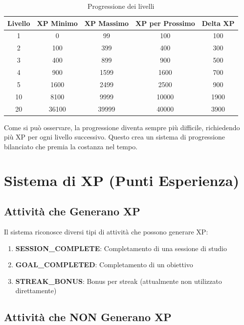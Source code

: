 \documentclass[11pt,a4paper]{article}
\begin{document}
\begin{table}[H]
\centering
\begin{tabular}{@{}ccccc@{}}
\toprule
\textbf{Livello} & \textbf{XP Minimo} & \textbf{XP Massimo} & \textbf{XP per Prossimo} & \textbf{Delta XP} \\
\midrule
1 & 0 & 99 & 100 & 100 \\
2 & 100 & 399 & 400 & 300 \\
3 & 400 & 899 & 900 & 500 \\
4 & 900 & 1599 & 1600 & 700 \\
5 & 1600 & 2499 & 2500 & 900 \\
10 & 8100 & 9999 & 10000 & 1900 \\
20 & 36100 & 39999 & 40000 & 3900 \\
\bottomrule
\end{tabular}
\caption{Progressione dei livelli}
\end{table}

Come si può osservare, la progressione diventa sempre più difficile, richiedendo più XP per ogni livello successivo. Questo crea un sistema di progressione bilanciato che premia la costanza nel tempo.

\section{Sistema di XP (Punti Esperienza)}

\subsection{Attività che Generano XP}

Il sistema riconosce diversi tipi di attività che possono generare XP:

\begin{enumerate}
    \item \textbf{SESSION\_COMPLETE}: Completamento di una sessione di studio
    \item \textbf{GOAL\_COMPLETED}: Completamento di un obiettivo
    \item \textbf{STREAK\_BONUS}: Bonus per streak (attualmente non utilizzato direttamente)
\end{enumerate}

\subsection{Attività che NON Generano XP}
\end{document}
